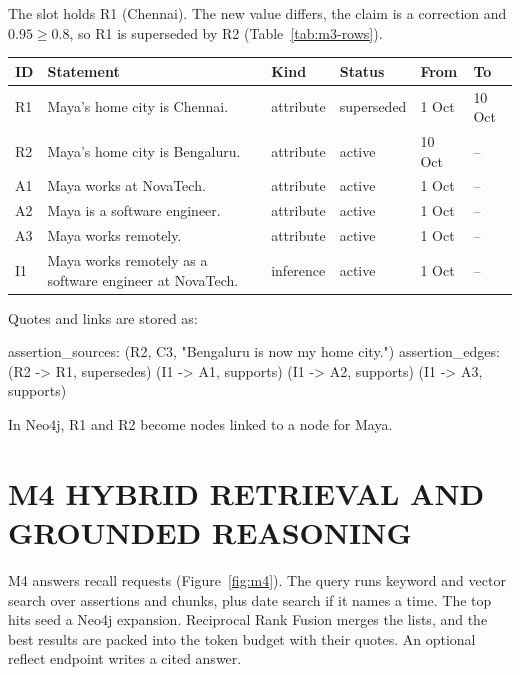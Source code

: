 \begin{maya}
The slot  holds R1 (Chennai). The new value differs, the claim is a
correction and $0.95 \geq 0.8$, so R1 is superseded by R2 (Table~\ref{tab:m3-rows}).
\begin{center}
\begin{minipage}{\linewidth}
\centering
{}
\label{tab:m3-rows}
\begin{reporttable}
\begin{tabularx}{\linewidth}{|L{0.6cm}|Y|L{1.6cm}|L{1.7cm}|L{1.2cm}|L{1.2cm}|}
\hline
\textbf{ID} & \textbf{Statement} & \textbf{Kind} & \textbf{Status} & \textbf{From} & \textbf{To} \\
\hline
R1 & Maya's home city is Chennai. & attribute & superseded & 1 Oct & 10 Oct \\
\hline
R2 & Maya's home city is Bengaluru. & attribute & active & 10 Oct & -- \\
\hline
A1 & Maya works at NovaTech. & attribute & active & 1 Oct & -- \\
\hline
A2 & Maya is a software engineer. & attribute & active & 1 Oct & -- \\
\hline
A3 & Maya works remotely. & attribute & active & 1 Oct & -- \\
\hline
I1 & Maya works remotely as a software engineer at NovaTech. & inference & active & 1 Oct & -- \\
\hline
\end{tabularx}
\end{reporttable}
\end{minipage}
\end{center}
Quotes and links are stored as:
\begin{datablock}
assertion_sources:  (R2, C3, "Bengaluru is now my home city.")
assertion_edges:    (R2 -> R1, supersedes)
                    (I1 -> A1, supports)
                    (I1 -> A2, supports)
                    (I1 -> A3, supports)
\end{datablock}
In Neo4j, R1 and R2 become  nodes linked to a  node for Maya.
\end{maya}

\section{\uppercase{M4 Hybrid Retrieval and Grounded Reasoning}}
M4 answers recall requests (Figure~\ref{fig:m4}). The query runs keyword and vector search
over assertions and chunks, plus date search if it names a time. The top hits seed a Neo4j
expansion. Reciprocal Rank Fusion merges the lists, and the best results are packed into the
token budget with their quotes. An optional reflect endpoint writes a cited answer.

